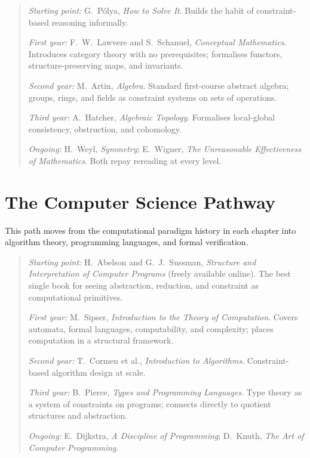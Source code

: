 \documentclass[11pt]{book}
\theoremstyle{plain}
\theoremstyle{definition}
\theoremstyle{remark}
\newenvironment{readinglist}
  {\begin{quote}\small}
  {\end{quote}}
\begin{document}
\begin{readinglist}
\textit{Starting point:} G.~P\'olya, \textit{How to Solve It}. Builds
the habit of constraint-based reasoning informally.

\textit{First year:} F.~W.~Lawvere and S.~Schanuel,
\textit{Conceptual Mathematics}. Introduces category theory with no
prerequisites; formalises functors, structure-preserving maps, and
invariants.

\textit{Second year:} M.~Artin, \textit{Algebra}. Standard
first-course abstract algebra; groups, rings, and fields as constraint
systems on sets of operations.

\textit{Third year:} A.~Hatcher, \textit{Algebraic Topology}.
Formalises local-global consistency, obstruction, and cohomology.

\textit{Ongoing:} H.~Weyl, \textit{Symmetry}; E.~Wigner,
\textit{The Unreasonable Effectiveness of Mathematics}. Both repay
rereading at every level.
\end{readinglist}

\section*{The Computer Science Pathway}

This path moves from the computational paradigm history in each chapter
into algorithm theory, programming languages, and formal verification.

\begin{readinglist}
\textit{Starting point:} H.~Abelson and G.~J.~Sussman,
\textit{Structure and Interpretation of Computer Programs} (freely
available online). The best single book for seeing abstraction,
reduction, and constraint as computational primitives.

\textit{First year:} M.~Sipser, \textit{Introduction to the Theory of
Computation}. Covers automata, formal languages, computability, and
complexity; places computation in a structural framework.

\textit{Second year:} T.~Cormen et al., \textit{Introduction to
Algorithms}. Constraint-based algorithm design at scale.

\textit{Third year:} B.~Pierce, \textit{Types and Programming
Languages}. Type theory as a system of constraints on programs;
connects directly to quotient structures and abstraction.

\textit{Ongoing:} E.~Dijkstra, \textit{A Discipline of Programming};
D.~Knuth, \textit{The Art of Computer Programming}.
\end{readinglist}
\end{document}
